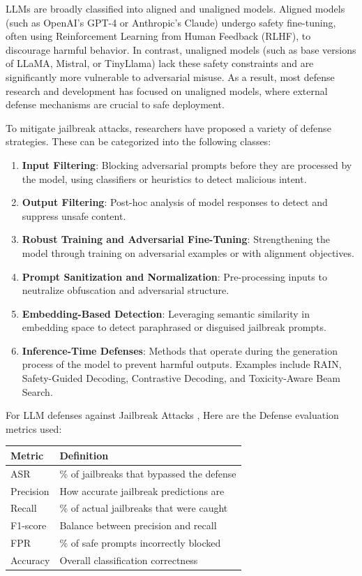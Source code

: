 \documentclass[../main.tex]{subfiles}
\begin{document}
LLMs are broadly classified into aligned and unaligned models. Aligned models (such as OpenAI's GPT-4 or Anthropic's Claude) undergo safety fine-tuning, often using Reinforcement Learning from Human Feedback (RLHF), to discourage harmful behavior. In contrast, unaligned models (such as base versions of LLaMA, Mistral, or TinyLlama) lack these safety constraints and are significantly more vulnerable to adversarial misuse. As a result, most defense research and development has focused on unaligned models, where external defense mechanisms are crucial to safe deployment.

To mitigate jailbreak attacks, researchers have proposed a variety of defense strategies. These can be categorized into the following classes:

\begin{enumerate}
    \item \textbf{Input Filtering}: Blocking adversarial prompts before they are processed by the model, using classifiers or heuristics to detect malicious intent.
    \item \textbf{Output Filtering}: Post-hoc analysis of model responses to detect and suppress unsafe content.
    \item \textbf{Robust Training and Adversarial Fine-Tuning}: Strengthening the model through training on adversarial examples or with alignment objectives.
    \item \textbf{Prompt Sanitization and Normalization}: Pre-processing inputs to neutralize obfuscation and adversarial structure.
    \item \textbf{Embedding-Based Detection}: Leveraging semantic similarity in embedding space to detect paraphrased or disguised jailbreak prompts.
    \item \textbf{Inference-Time Defenses}: Methods that operate during the generation process of the model to prevent harmful outputs. Examples include RAIN, Safety-Guided Decoding, Contrastive Decoding, and Toxicity-Aware Beam Search.
\end{enumerate}
 For LLM defenses against Jailbreak Attacks , Here are the Defense evaluation metrics used:                         
\begin{center}
\begin{tabular}{|l|p{8cm}|}
\hline
\textbf{Metric} & \textbf{Definition} \\
\hline
ASR & \% of jailbreaks that bypassed the defense \\
\hline
Precision & How accurate jailbreak predictions are \\
\hline
Recall & \% of actual jailbreaks that were caught \\
\hline
F1-score & Balance between precision and recall \\
\hline
FPR & \% of safe prompts incorrectly blocked \\
\hline
Accuracy & Overall classification correctness \\
\hline
\end{tabular}
\end{center}
\end{document}
